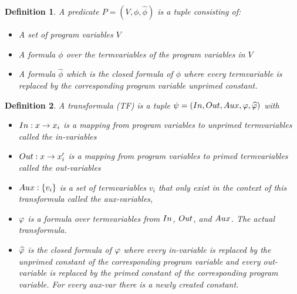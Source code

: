 \documentclass{article}
\newtheorem{mydef}{Definition}
\begin{document}
	\begin{mydef}
		A predicate $P = (V, \phi, \widehat{\phi})$ is a tuple consisting of: 
		\begin{itemize}
			\item A set of program variables $V$
			\item A formula $\phi$ over the termvariables of the program variables in $V$
			\item A formula $\widehat{\phi}$ which is the closed formula of $\phi$ where every termvariable is replaced by the corresponding program variable unprimed constant.
		\end{itemize}
	\end{mydef}
	

    \begin{mydef}
        A transformula (TF) is a tuple $\psi = (In, Out, Aux, \varphi, \widehat{\varphi})$ with 
        \begin{itemize}
          \item $In : x \rightarrow x_i$ is a mapping from program variables to unprimed termvariables called the in-variables
          \item $Out : x \rightarrow x_i'$ is a mapping from program variables to primed termvariables called the out-variables
          \item $Aux: \{ v_i \}$ is a set of termvariables $v_i$ that only exist in the context of this transformula called the aux-variables,
          \item $\varphi$ is a formula over termvariables from $In$, $Out$, and $Aux$. The actual transformula.
          \item $\widehat{\varphi}$ is the closed formula of $\varphi$ where every in-variable is replaced by the unprimed constant of the corresponding program variable and every out-variable is replaced by the primed constant of the corresponding program variable. For every aux-var there is a newly created constant.
        \end{itemize}
    \end{mydef}
\end{document}
